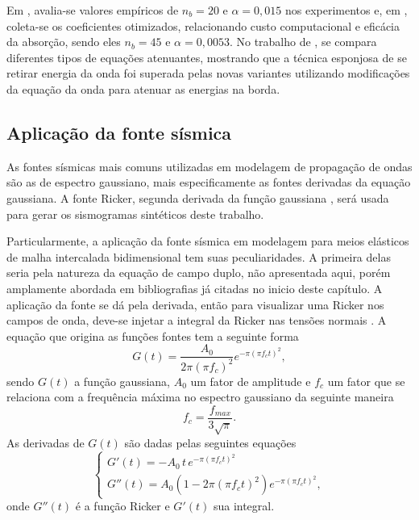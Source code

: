 \documentclass[
	12pt,				%
	openright,			%
	oneside,			%
	a4paper,			%
	english,			%
	brazil				%
	]{abntex2}
\begin{document}
	Em , avalia-se valores empíricos de $n_b = 20$ e $\alpha = 0,015$ nos experimentos e, em , coleta-se os coeficientes otimizados, relacionando custo computacional e eficácia da absorção, sendo eles $n_b = 45$ e $\alpha=0,0053$. No trabalho de  , se compara diferentes tipos de equações atenuantes, mostrando que a técnica esponjosa de se retirar energia da onda foi superada pelas novas variantes utilizando modificações da equação da onda para atenuar as energias na borda.  

\subsection*{Aplicação da fonte sísmica}

	As fontes sísmicas mais comuns utilizadas em modelagem de propagação de ondas são as de espectro gaussiano, mais especificamente as fontes derivadas da equação gaussiana. A fonte Ricker, segunda derivada da função gaussiana \cite{ricker1953form}, será usada para gerar os sismogramas sintéticos deste trabalho. 
	
	Particularmente, a aplicação da fonte sísmica em modelagem para meios elásticos de malha intercalada bidimensional tem suas peculiaridades. A primeira delas seria pela natureza da equação de campo duplo, não apresentada aqui, porém amplamente abordada em bibliografias já citadas no inicio deste capítulo. A aplicação da fonte se dá pela derivada, então para visualizar uma Ricker nos campos de onda, deve-se injetar a integral da Ricker nas tensões normais \cite{virieux1986p}. A equação que origina as funções fontes tem a seguinte forma 
%	
	\begin{equation}
		G(t) = \dfrac{A_0}{2\pi(\pi f_c)^2}e^{-\pi(\pi f_c t)^2},
	\end{equation}  
%	
	\noindent sendo $G(t)$ a função gaussiana, $A_0$ um fator de amplitude e $f_c$ um fator que se relaciona com a frequência máxima no espectro gaussiano da seguinte maneira
%	
	\begin{equation}
		f_c = \dfrac{f_{max}}{3\sqrt{\pi}}.
	\end{equation} 	
%	
	\noindent As derivadas de $G(t)$ são dadas pelas seguintes equações 
%	
	\begin{equation}
		\begin{cases}
		G'(t) = - A_0\,t\, e^{-\pi (\pi f_c t)^2} \\
		G''(t) = A_0(1 - 2\pi(\pi f_c t)^2)e^{-\pi (\pi f_c t)^2}, 
		\end{cases}
	\end{equation}	
%	
	\noindent onde $G''(t)$ é a função Ricker e $G'(t)$ sua integral.		
	
\end{document}
